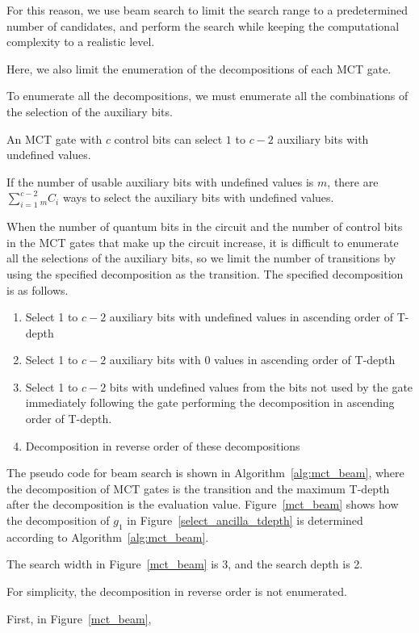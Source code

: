 For this reason, we use beam search \cite{bisiani1992beam} to limit the search range to a predetermined number of candidates,
and perform the search while keeping the computational complexity to a realistic level.

Here, we also limit the enumeration of the decompositions of each MCT gate.

To enumerate all the decompositions, we must enumerate all the combinations of the selection of the auxiliary bits.

An MCT gate with $c$ control bits can select $1$ to $c-2$ auxiliary bits with undefined values.

If the number of usable auxiliary bits with undefined values is $m$,
there are $\sum_{i = 1}^{c-2} {}_mC_{i}$ ways to select the auxiliary bits with undefined values.

When the number of quantum bits in the circuit and the number of control bits in the MCT gates that make up the circuit increase,
it is difficult to enumerate all the selections of the auxiliary bits,
so we limit the number of transitions by using the specified decomposition as the transition.
The specified decomposition is as follows.
\begin{enumerate}[(1)]
\item Select 1 to $c-2$ auxiliary bits with undefined values in ascending order of T-depth
\item Select 1 to $c-2$ auxiliary bits with 0 values in ascending order of T-depth
\item Select 1 to $c-2$ bits with undefined values from the bits not used by the gate immediately following the gate performing the decomposition in ascending order of T-depth.
\item Decomposition in reverse order of these decompositions
\end{enumerate}
\par
The pseudo code for beam search is shown in Algorithm~\ref{alg:mct_beam}, where the decomposition of MCT gates is the transition and the maximum T-depth after the decomposition is the evaluation value.
Figure~\ref{mct_beam} shows how the decomposition of $g_{1}$ in Figure~\ref{select_ancilla_tdepth} is determined according to Algorithm~\ref{alg:mct_beam}.

The search width in Figure~\ref{mct_beam} is 3, and the search depth is 2.

For simplicity, the decomposition in reverse order is not enumerated.

First, in Figure~\ref{mct_beam},

